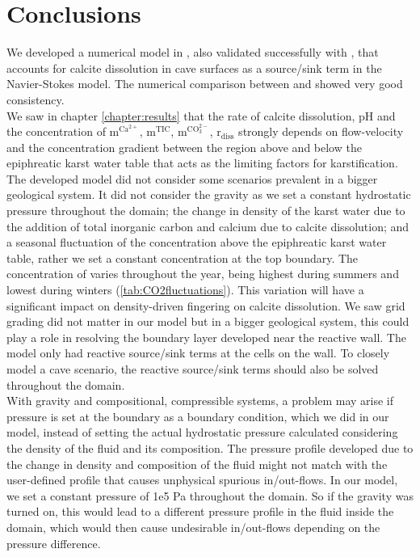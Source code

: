 \chapter{Conclusions} \label{chapter:conclusions}
\thispagestyle{empty}
We developed a numerical model in \DuMuX, also validated successfully with \MATLAB, that accounts for calcite dissolution 
in cave surfaces as a source/sink term in the Navier-Stokes model. The numerical 
comparison between \DuMuX and \MATLAB showed very good consistency.\\

We saw in chapter \ref{chapter:results} that the rate of calcite dissolution, pH and the 
concentration of $\mathrm{m^{Ca^{2+}}}$, $\mathrm{m^{TIC}}$, $\mathrm{m^{CO_3^{2-}}}$, $\mathrm{r_{diss}}$ strongly depends on 
flow-velocity and the concentration gradient between the region above and below the epiphreatic karst water table that 
acts as the limiting factors for karstification. \\

The developed model did not consider some scenarios prevalent in a bigger geological system. It did not consider the gravity 
as we set a constant hydrostatic pressure throughout the domain; the change in density of the karst water due to the addition of total inorganic carbon 
and calcium due to calcite dissolution; and a seasonal fluctuation of the  concentration above the epiphreatic karst water table, 
rather we set a constant concentration at the top boundary. The concentration of  varies throughout the year, being highest during summers and lowest during 
winters (\cref{tab:CO2fluctuations}). This variation will have a significant impact on density-driven fingering on calcite dissolution. 
We saw grid grading did not matter in our model but in a bigger geological system, this could play a role in resolving the boundary layer 
developed near the reactive wall. The \DuMuX model only had reactive source/sink terms at the cells on the wall. 
To closely model a cave scenario, the reactive source/sink terms should also be solved throughout the domain. \\

With gravity and compositional, compressible systems, a problem may arise if pressure is set at the boundary as a boundary condition, 
which we did in our model, instead of setting the actual hydrostatic pressure calculated considering the density of the fluid and its composition. 
The pressure profile developed due to the change in density and composition of the fluid might not match with the 
user-defined profile that causes unphysical spurious in/out-flows. 
In our \DuMuX model, we set a constant pressure of 1e5 Pa throughout the domain. So if the gravity was turned on, this would lead to a different 
pressure profile in the fluid inside the domain, which would then cause undesirable in/out-flows depending on the pressure 
difference. \\

